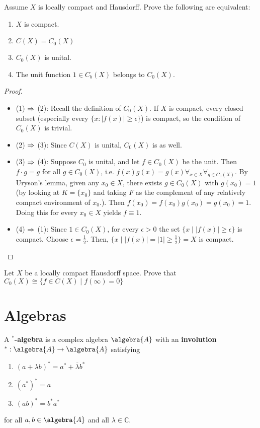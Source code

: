\documentclass[a4paper]{article}
\begin{document}
\begin{exercise}
	Assume $X$ is locally compact and Hausdorff. Prove the following are equivalent:
	\begin{enumerate}[label=(\arabic*)]
		\item $X$ is compact.
		\item $C(X) = C_0(X)$
		\item $C_0(X)$ is unital.
		\item The unit function $1 \in C_b(X)$ belongs to $C_0(X)$.
	\end{enumerate}
\end{exercise}

\begin{proof}
	\begin{itemize}
		\item (1) $\Rightarrow$ (2): Recall the definition of $C_0(X)$. If $X$ is compact, every closed subset (especially every $\{x : |f(x)| \geq \epsilon\}$) is compact, so the condition of $C_0(X)$ is trivial.
		\item (2) $\Rightarrow$ (3): Since $C(X)$ is unital, $C_0(X)$ is as well.
		\item (3) $\Rightarrow$ (4): Suppose $C_0$ is unital, and let $f \in C_0(X)$ be the unit. Then $f \cdot g = g$ for all $g \in C_0(X)$, i.e. $f(x) g(x) = g(x) \forall_{x \in X} \forall_{g \in C_0(X)}$. By Uryson's lemma, given any $x_0 \in X$, there exists $g \in C_0(X)$ with $g(x_0) = 1$ (by looking at $K = \{x_0\}$ and taking $F$ as the complement of any relatively compact environment of $x_0$.). Then $f(x_0) = f(x_0) g(x_0) = g(x_0) = 1$. Doing this for every $x_0 \in X$ yields $f \equiv 1$.
		\item (4) $\Rightarrow$ (1): Since $1 \in C_0(X)$, for every $\epsilon > 0$ the set $\{x \mid |f(x)| \geq \epsilon\}$ is compact. Choose $\epsilon = \frac{1}{2}$. Then, $\{x \mid |f(x)| = |1| \geq \frac{1}{2}\} = X$ is compact.
	\end{itemize}
\end{proof}

\begin{exercise}
	Let $X$ be a locally compact Hausdorff space.
	Prove that $C_0(X) \cong \{f \in C(X) \mid f(\infty) = 0\}$
\end{exercise}

\section{Algebras}

\begin{definition}
	A \textbf{$^*$-algebra} is a complex algebra $\algebra{A}$ with an \textbf{involution} $^*: \algebra{A} \to \algebra{A}$ satisfying
	\begin{enumerate}
		\item $(a + \lambda b)^* = a^* + \overline{\lambda} b^*$
		\item $(a^*)^* = a$
		\item $(ab)^* = b^* a^*$
	\end{enumerate}
	for all $a,b \in \algebra{A}$ and all $\lambda \in \mathds{C}$.
\end{definition}
\end{document}
